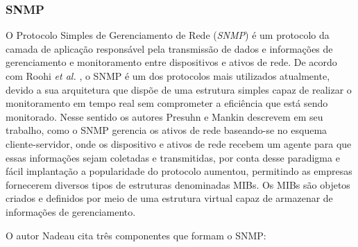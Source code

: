 
\subsubsection{SNMP}

O Protocolo Simples de Gerenciamento de Rede (\textit{\acrlong{SNMP}}) é um protocolo da camada de aplicação responsável pela transmissão de dados e informações de gerenciamento e monitoramento entre dispositivos e ativos de rede. De acordo com Roohi \textit{et al.} \cite{roohi2014application}, o \acrshort{SNMP} é um dos protocolos mais utilizados atualmente, devido a sua arquitetura que dispõe de uma estrutura simples capaz de realizar o monitoramento em tempo real sem comprometer a eficiência que está sendo monitorado. Nesse sentido os autores Presuhn e Mankin \cite{roohi2014application,presuhn2002management} descrevem  em seu trabalho, como o \acrshort{SNMP} gerencia os ativos de rede baseando-se no esquema cliente-servidor, onde os dispositivo e ativos de rede recebem um agente para que essas informações sejam coletadas e transmitidas, por conta desse paradigma e fácil implantação a popularidade do protocolo aumentou, permitindo as empresas fornecerem diversos tipos de estruturas denominadas \acrshort{MIBs}. Os \acrshort{MIBs} são objetos criados e definidos por meio de uma estrutura virtual capaz de armazenar de informações de gerenciamento.

O autor Nadeau\cite{nadeau2003mpls} cita três componentes que formam o \acrshort{SNMP}:  

